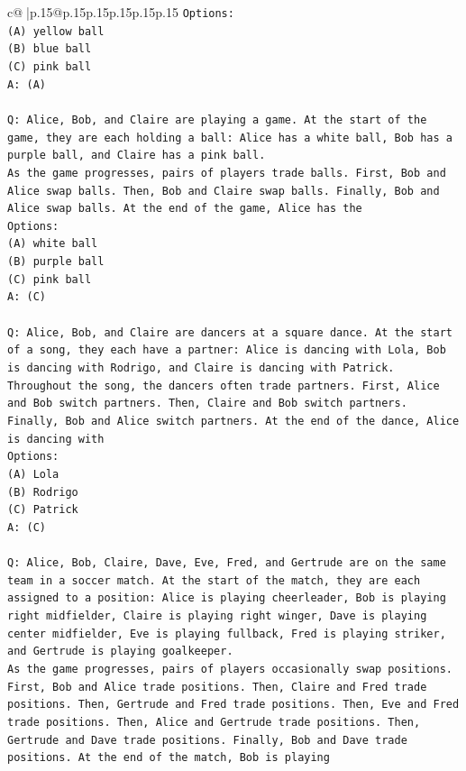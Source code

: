 \documentclass{article}
\begin{document}
{\begin{supertabular}{c@{$\;$}|p{.15\linewidth}@{}p{.15\linewidth}p{.15\linewidth}p{.15\linewidth}p{.15\linewidth}p{.15\linewidth}}
{{{\texttt{Options:} \\
\texttt{(A) yellow ball} \\
\texttt{(B) blue ball} \\
\texttt{(C) pink ball} \\
\texttt{A: (A)} \\
\\ 
\texttt{Q: Alice, Bob, and Claire are playing a game. At the start of the game, they are each holding a ball: Alice has a white ball, Bob has a purple ball, and Claire has a pink ball.} \\
\texttt{As the game progresses, pairs of players trade balls. First, Bob and Alice swap balls. Then, Bob and Claire swap balls. Finally, Bob and Alice swap balls. At the end of the game, Alice has the} \\
\texttt{Options:} \\
\texttt{(A) white ball} \\
\texttt{(B) purple ball} \\
\texttt{(C) pink ball} \\
\texttt{A: (C)} \\
\\ 
\texttt{Q: Alice, Bob, and Claire are dancers at a square dance. At the start of a song, they each have a partner: Alice is dancing with Lola, Bob is dancing with Rodrigo, and Claire is dancing with Patrick.} \\
\texttt{Throughout the song, the dancers often trade partners. First, Alice and Bob switch partners. Then, Claire and Bob switch partners. Finally, Bob and Alice switch partners. At the end of the dance, Alice is dancing with} \\
\texttt{Options:} \\
\texttt{(A) Lola} \\
\texttt{(B) Rodrigo} \\
\texttt{(C) Patrick} \\
\texttt{A: (C)} \\
\\ 
\texttt{Q: Alice, Bob, Claire, Dave, Eve, Fred, and Gertrude are on the same team in a soccer match. At the start of the match, they are each assigned to a position: Alice is playing cheerleader, Bob is playing right midfielder, Claire is playing right winger, Dave is playing center midfielder, Eve is playing fullback, Fred is playing striker, and Gertrude is playing goalkeeper.} \\
\texttt{As the game progresses, pairs of players occasionally swap positions. First, Bob and Alice trade positions. Then, Claire and Fred trade positions. Then, Gertrude and Fred trade positions. Then, Eve and Fred trade positions. Then, Alice and Gertrude trade positions. Then, Gertrude and Dave trade positions. Finally, Bob and Dave trade positions. At the end of the match, Bob is playing} \\
}}}
\end{supertabular}}
\end{document}
